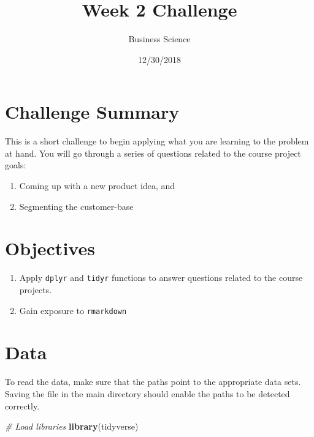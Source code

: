 \documentclass[]{article}
\title{Week 2 Challenge}
\author{Business Science}
\date{12/30/2018}
\newenvironment{Shaded}{\begin{snugshade}}{\end{snugshade}}
\newcommand{\CommentTok}[1]{\textcolor[rgb]{0.56,0.35,0.01}{\textit{#1}}}
\newcommand{\KeywordTok}[1]{\textcolor[rgb]{0.13,0.29,0.53}{\textbf{#1}}}
\newcommand{\NormalTok}[1]{#1}
\begin{document}
\maketitle

{
\setcounter{tocdepth}{2}
\tableofcontents
}
\hypertarget{challenge-summary}{%
\section{Challenge Summary}\label{challenge-summary}}

This is a short challenge to begin applying what you are learning to the
problem at hand. You will go through a series of questions related to
the course project goals:

\begin{enumerate}
\def\labelenumi{\arabic{enumi}.}
\item
  Coming up with a new product idea, and
\item
  Segmenting the customer-base
\end{enumerate}

\hypertarget{objectives}{%
\section{Objectives}\label{objectives}}

\begin{enumerate}
\def\labelenumi{\arabic{enumi}.}
\item
  Apply \texttt{dplyr} and \texttt{tidyr} functions to answer questions
  related to the course projects.
\item
  Gain exposure to \texttt{rmarkdown}
\end{enumerate}

\hypertarget{data}{%
\section{Data}\label{data}}

To read the data, make sure that the paths point to the appropriate data
sets. Saving the file in the main directory should enable the paths to
be detected correctly.

\begin{Shaded}
\begin{Highlighting}[]
\CommentTok{# Load libraries}
\KeywordTok{library}\NormalTok{(tidyverse)}
\end{Highlighting}
\end{Shaded}
\end{document}

